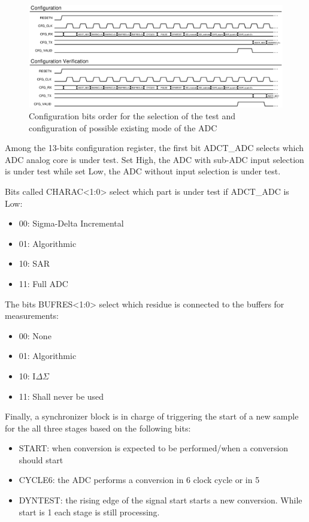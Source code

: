 \begin{figure}[htp]
    \centering
    \includegraphics[width=\textwidth]{Chapter5/Figs/adc_chip/ADC_CFG_SPI.ps}
    \caption{Configuration bits order for the selection of the test and configuration of possible existing mode of the ADC}
    \label{fig:adc-test-config-link}
\end{figure}

Among the 13-bits configuration register, the first bit ADCT\_ADC selects which ADC analog core is under test. Set High, the ADC with sub-ADC input selection is under test while set Low, the ADC without input selection is under test.

Bits called CHARAC<1:0> select which part is under test if ADCT\_ADC is Low:
\begin{itemize}
    \item 00: Sigma-Delta Incremental
    \item 01: Algorithmic
    \item 10: SAR
    \item 11: Full ADC
\end{itemize}

The bits BUFRES<1:0> select which residue is connected to the buffers for measurements:
\begin{itemize}
    \item 00: None
    \item 01: Algorithmic
    \item 10: I\(\Delta \Sigma\)
    \item 11: Shall never be used
\end{itemize}

Finally, a synchronizer block is in charge of triggering the start of a new sample for the all three stages based on the following bits:
\begin{itemize}
    \item START: when conversion is expected to be performed/when a conversion should start
    \item CYCLE6: the ADC performs a conversion in 6 clock cycle or in 5
    \item DYNTEST: the rising edge of the signal start starts a new conversion. While start is 1 each stage is still processing.
\end{itemize}

